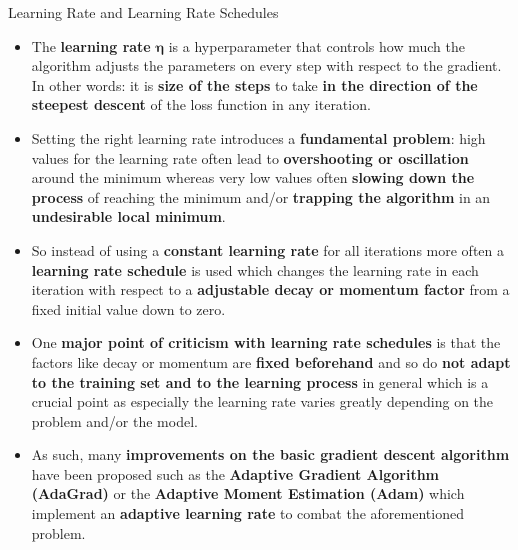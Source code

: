 \documentclass[document.tex]{subfiles}
\begin{document}
    \begin{frame}{Learning Rate and Learning Rate Schedules}
        \begin{itemize}
            \item The \textbf{learning rate} $\pmb{\eta}$ is a hyperparameter that controls how much the algorithm adjusts the parameters on every step with respect to the gradient. In other words: it is \textbf{size of the steps} to take \textbf{in the direction of the steepest descent} of the loss function in any iteration.
            \item Setting the right learning rate introduces a \textbf{fundamental problem}: high values for the learning rate often lead to \textbf{overshooting or oscillation} around the minimum whereas very low values often \textbf{slowing down the process} of reaching the minimum and/or \textbf{trapping the algorithm} in an \textbf{undesirable local minimum}.
            \item So instead of using a \textbf{constant learning rate} for all iterations more often a \textbf{learning rate schedule} is used which changes the learning rate in each iteration with respect to a \textbf{adjustable decay or momentum factor} from a fixed initial value down to zero.
            \item One \textbf{major point of criticism with learning rate schedules} is that the factors like decay or momentum are \textbf{fixed beforehand} and so do \textbf{not adapt to the training set and to the learning process} in general which is a crucial point as especially the learning rate varies greatly depending on the problem and/or the model.
            \item As such, many \textbf{improvements on the basic gradient descent algorithm} have been proposed such as the \textbf{Adaptive Gradient Algorithm (AdaGrad)} or the \textbf{Adaptive Moment Estimation (Adam)} which implement an \textbf{adaptive learning rate} to combat the aforementioned problem.
        \end{itemize}
    \end{frame}
\end{document}
